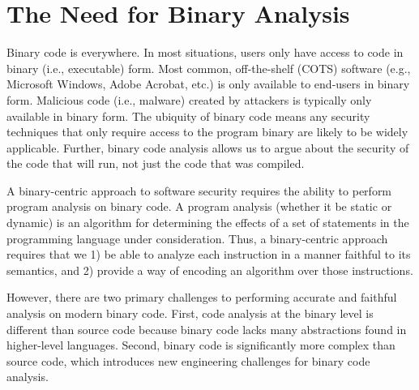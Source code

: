 \section{The Need for Binary Analysis}
\label{vine:introduction}



Binary code is everywhere. In most situations, users only have access
to code in binary (i.e., executable) form.  Most common, off-the-shelf
(COTS) software (e.g., Microsoft Windows, Adobe Acrobat, etc.) is only
available to end-users in binary form.  Malicious code (i.e., malware)
created by attackers is typically only available in binary form.  The
ubiquity of binary code means any security techniques that only
require access to the program binary are likely to be widely
applicable. Further, binary code analysis allows us to argue about the
security of the code that will run, not just the code that was
compiled. 


A binary-centric approach to software security requires the ability
to perform program analysis on binary code. A program analysis
(whether it be static or dynamic) is an algorithm for determining the
effects of a set of statements in the programming language under
consideration.  Thus, a binary-centric approach requires that
we 1) be able to analyze each instruction in a manner faithful to its
semantics, and 2) provide a way of encoding an algorithm over those
instructions. 

However, there are two primary challenges to performing accurate and
faithful analysis on modern binary code. First, code analysis at the
binary level is different than source code because binary code lacks
many abstractions found in higher-level languages. Second, binary code
is significantly more complex than source code, which introduces new
engineering challenges for binary code analysis.  


